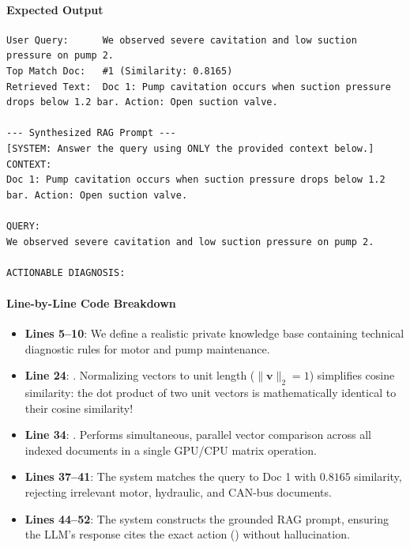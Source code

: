 \paragraph{Expected Output}
\begin{lstlisting}[style=outputstyle]
User Query:      We observed severe cavitation and low suction pressure on pump 2.
Top Match Doc:   #1 (Similarity: 0.8165)
Retrieved Text:  Doc 1: Pump cavitation occurs when suction pressure drops below 1.2 bar. Action: Open suction valve.

--- Synthesized RAG Prompt ---
[SYSTEM: Answer the query using ONLY the provided context below.]
CONTEXT:
Doc 1: Pump cavitation occurs when suction pressure drops below 1.2 bar. Action: Open suction valve.

QUERY:
We observed severe cavitation and low suction pressure on pump 2.

ACTIONABLE DIAGNOSIS:
\end{lstlisting}

\paragraph{Line-by-Line Code Breakdown}
\begin{itemize}
    \item \textbf{Lines 5--10}: We define a realistic private knowledge base containing technical diagnostic rules for motor and pump maintenance.
    \item \textbf{Line 24}: . Normalizing vectors to unit length ($\|\mathbf{v}\|_2 = 1$) simplifies cosine similarity: the dot product of two unit vectors is mathematically identical to their cosine similarity!
    \item \textbf{Line 34}: . Performs simultaneous, parallel vector comparison across all indexed documents in a single GPU/CPU matrix operation.
    \item \textbf{Lines 37--41}: The system matches the query to Doc 1 with $0.8165$ similarity, rejecting irrelevant motor, hydraulic, and CAN-bus documents.
    \item \textbf{Lines 44--52}: The system constructs the grounded RAG prompt, ensuring the LLM's response cites the exact action () without hallucination.
\end{itemize}

